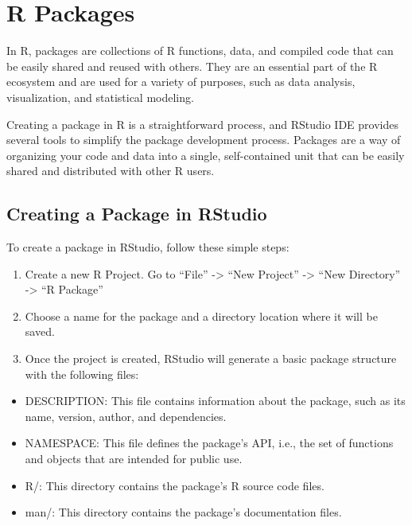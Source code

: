\documentclass[
]{book}
\providecommand{\tightlist}{%
  \setlength{\itemsep}{0pt}\setlength{\parskip}{0pt}}
\begin{document}
\hypertarget{r-packages}{%
\section{R Packages}\label{r-packages}}

In R, packages are collections of R functions, data, and compiled code that can be easily shared and reused with others. They are an essential part of the R ecosystem and are used for a variety of purposes, such as data analysis, visualization, and statistical modeling.

Creating a package in R is a straightforward process, and RStudio IDE provides several tools to simplify the package development process. Packages are a way of organizing your code and data into a single, self-contained unit that can be easily shared and distributed with other R users.

\hypertarget{creating-a-package-in-rstudio}{%
\subsection{Creating a Package in RStudio}\label{creating-a-package-in-rstudio}}

To create a package in RStudio, follow these simple steps:

\begin{enumerate}
\def\labelenumi{\arabic{enumi}.}
\tightlist
\item
  Create a new R Project. Go to ``File'' -\textgreater{} ``New Project'' -\textgreater{} ``New Directory'' -\textgreater{} ``R Package''
\item
  Choose a name for the package and a directory location where it will be saved.
\item
  Once the project is created, RStudio will generate a basic package structure with the following files:
\end{enumerate}

\begin{itemize}
\tightlist
\item
  DESCRIPTION: This file contains information about the package, such as its name, version, author, and dependencies.
\item
  NAMESPACE: This file defines the package's API, i.e., the set of functions and objects that are intended for public use.
\item
  R/: This directory contains the package's R source code files.
\item
  man/: This directory contains the package's documentation files.
\end{itemize}
\end{document}

